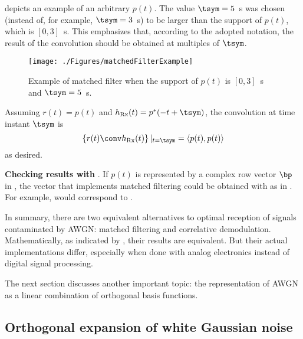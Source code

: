  depicts an example of an arbitrary $p(t)$. The value $\tsym=5$~s was chosen (instead of, for example, $\tsym=3$~s) to be larger than the support of $p(t)$, which is $[0, 3]$~s. This emphasizes that, according to the adopted notation, the result of the convolution should be obtained at multiples of $\tsym$.

\begin{figure}
\centering
\texttt{[image: ./Figures/matchedFilterExample]}
\caption{Example of matched filter when the support of $p(t)$ is $[0, 3]$~s and $\tsym=5$~s.\label{fig:matchedFilterExample}}
\end{figure}

Assuming $r(t)=p(t)$ and $h_\textrm{Rx}(t) = p^*(-t + \tsym)$, the convolution at time instant $\tsym$ is
\begin{equation}
\left\{ r(t) \conv h_\textrm{Rx}(t) \right\} |_{t=\tsym} = \langle p(t),p(t)\rangle
\label{eq:convCorrGiveSameResult}
\end{equation}
as desired.

\bExample \textbf{Checking results with {\matlab}}.
If $p(t)$ is represented by a complex row vector $\bp$ in {\matlab}, the vector that implements matched filtering could be obtained with  as in . For example,  would correspond to . 
\eExample

In summary, there are two equivalent alternatives to optimal reception of signals contaminated by AWGN: matched filtering and correlative demodulation. Mathematically, as indicated by , their results are equivalent. But their actual implementations differ, especially when done with analog electronics instead of digital signal processing.

The next section discusses another important topic: the representation of AWGN as a linear
combination of orthogonal basis functions.

\subsection{Orthogonal expansion of white Gaussian noise}
\label{sec:orthogonalExpansionWGN}

